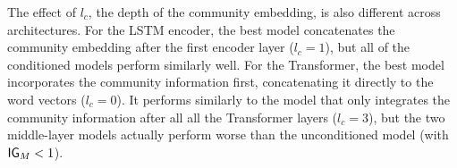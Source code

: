 \documentclass[11pt]{article}
\begin{document}
The effect of $l_c$, the depth of the community embedding,
is also different across architectures.
For the LSTM encoder, 
the best model concatenates the community embedding after the first encoder layer ($l_c=1$),
but all of the conditioned models perform similarly well.
For the Transformer, the best model incorporates the community information
first, concatenating it directly to the word vectors ($l_c=0$).
It performs similarly to the model that only integrates the community information
after all all the Transformer layers ($l_c=3$),
but the two middle-layer models actually perform worse than the unconditioned model
(with $\mathsf{IG}_M < 1$).

\end{document}
